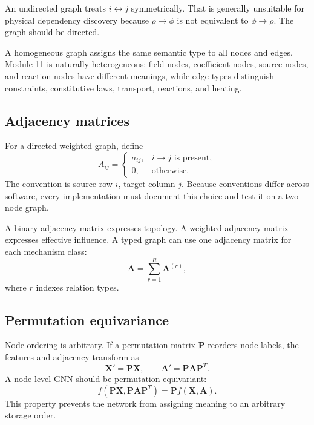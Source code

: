 \documentclass[11pt]{article}
\newcommand{\Xmat}{\bm{X}}
\newcommand{\Amat}{\bm{A}}
\begin{document}
An undirected graph treats \(i\leftrightarrow j\) symmetrically. That is generally unsuitable for physical dependency discovery because \(\rho\rightarrow\phi\) is not equivalent to \(\phi\rightarrow\rho\). The graph should be directed.

A homogeneous graph assigns the same semantic type to all nodes and edges. Module 11 is naturally heterogeneous: field nodes, coefficient nodes, source nodes, and reaction nodes have different meanings, while edge types distinguish constraints, constitutive laws, transport, reactions, and heating.

\subsection{Adjacency matrices}

For a directed weighted graph, define
\begin{equation}
A_{ij}=\begin{cases}
a_{ij}, & i\rightarrow j\text{ is present},\\0,&\text{otherwise.}\end{cases}
\end{equation}
The convention is source row \(i\), target column \(j\). Because conventions differ across software, every implementation must document this choice and test it on a two-node graph.

A binary adjacency matrix expresses topology. A weighted adjacency matrix expresses effective influence. A typed graph can use one adjacency matrix for each mechanism class:
\begin{equation}
\Amat=\sum_{r=1}^{R}\Amat^{(r)},
\end{equation}
where \(r\) indexes relation types.

\subsection{Permutation equivariance}

Node ordering is arbitrary. If a permutation matrix \(\bm{P}\) reorders node labels, the features and adjacency transform as
\begin{equation}
\Xmat' = \bm{P}\Xmat,\qquad
\Amat'=\bm{P}\Amat\bm{P}^{T}.
\end{equation}
A node-level GNN should be permutation equivariant:
\begin{equation}
f(\bm{P}\Xmat,\bm{P}\Amat\bm{P}^{T})=\bm{P}f(\Xmat,\Amat).
\end{equation}
This property prevents the network from assigning meaning to an arbitrary storage order.
\end{document}
